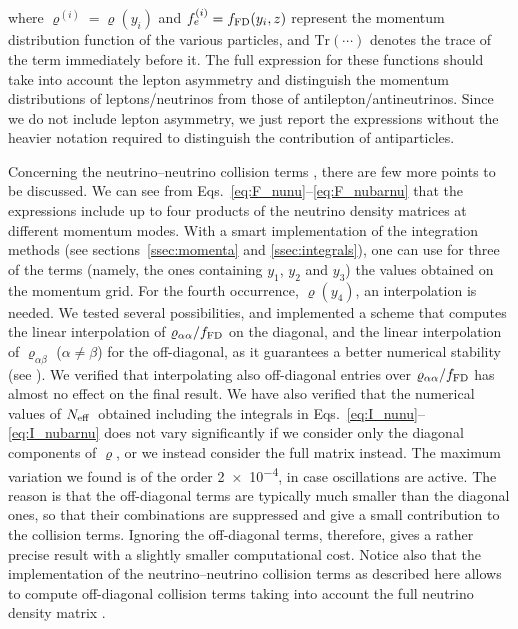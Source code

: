 \documentclass[notitlepage,nofootinbib,showpacs,preprintnumbers,amsmath,amssymb,superscriptaddress,prd,onecolumn]{revtex4-1}
\newcommand{\Neff}{\ensuremath{N_{\rm eff}}}
\begin{document}
where $\varrho^{(i)}=\varrho(y_i)$ and $f_e^{(i)}=f_{\rm FD}(y_i, z)$ represent the momentum distribution function
of the various particles,
and $\mathrm{Tr}(\cdots)$ denotes the trace of the term immediately before it.
The full expression for these functions should take into account the lepton asymmetry and distinguish
the momentum distributions of leptons/neutrinos from those of antilepton/antineutrinos.
Since we do not include lepton asymmetry, we just report the expressions without the heavier notation
required to distinguish the contribution of antiparticles.

Concerning the neutrino--neutrino collision terms \cite{Bennett:2020zkv},
there are few more points to be discussed.
We can see from Eqs.~\eqref{eq:F_nunu}--\eqref{eq:F_nubarnu} that the expressions include
up to four products of the neutrino density matrices at different momentum modes.
With a smart implementation of the integration methods
(see sections~\ref{ssec:momenta} and \ref{ssec:integrals}),
one can use for three of the terms (namely, the ones containing $y_1$, $y_2$ and $y_3$)
the values obtained on the momentum grid.
For the fourth occurrence, $\varrho(y_4)$, an interpolation is needed.
We tested several possibilities, and implemented a scheme that computes
the linear interpolation of $\varrho_{\alpha\alpha}/f_{\rm FD}$ on the diagonal,
and the linear interpolation of $\varrho_{\alpha\beta}$ ($\alpha\neq\beta$) for the off-diagonal,
as it guarantees a better numerical stability (see \cite{Bennett:2020zkv}).
We verified that interpolating also off-diagonal entries
over $\varrho_{\alpha\alpha}/f_{\rm FD}$ has almost no effect on the final result.
We have also verified that the numerical values of \Neff\ obtained including the integrals in
Eqs.~\eqref{eq:I_nunu}--\eqref{eq:I_nubarnu}
does not vary significantly if we consider only the diagonal components of $\varrho$,
or we instead consider the full matrix instead.
The maximum variation we found is of the order \num{2e-4}, in case oscillations are active.
The reason is that the off-diagonal terms are typically much smaller than the diagonal ones,
so that their combinations are suppressed and give a small contribution to the collision terms.
Ignoring the off-diagonal terms, therefore, gives a rather precise result with a slightly smaller computational cost.
Notice also that the implementation of the neutrino--neutrino collision terms as described here
allows to compute off-diagonal collision terms
taking into account the full neutrino density matrix \cite{Bennett:2020zkv}.
\end{document}
